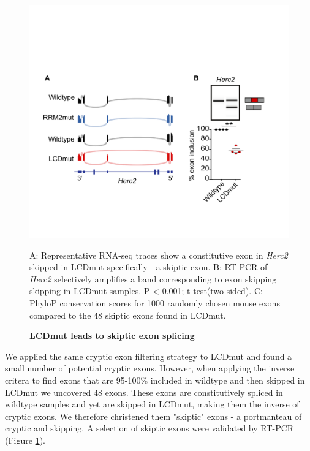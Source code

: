 \begin{figure}[h!]
	\centering
	\includegraphics[width=14cm]{Figures/05_tdp_mice/skiptic_exon_multi.png}
	\caption{\textbf{LCDmut leads to skiptic exon splicing}}
	A: Representative RNA-seq traces show a constitutive exon in \textit{Herc2} skipped in LCDmut specifically - a skiptic exon. B: RT-PCR of \textit{Herc2} selectively amplifies a band corresponding to exon skipping skipping in LCDmut samples. P < 0.001; t-test(two-sided). C: PhyloP conservation scores for 1000 randomly chosen mouse exons compared to the 48 skiptic exons found in LCDmut.
	\label{fig:skiptic_multi}
\end{figure}

We applied the same cryptic exon filtering strategy to LCDmut and found a small number of potential cryptic exons. However, when applying the inverse critera to find exons that are 95-100\% included in wildtype and then skipped in LCDmut we uncovered 48 exons. These exons are constitutively spliced in wildtype samples and yet are skipped in LCDmut, making them the inverse of cryptic exons. We therefore christened them "skiptic" exons - a portmanteau of cryptic and skipping. A selection of skiptic exons were validated by RT-PCR (Figure \ref{fig:skiptic_multi}). 


